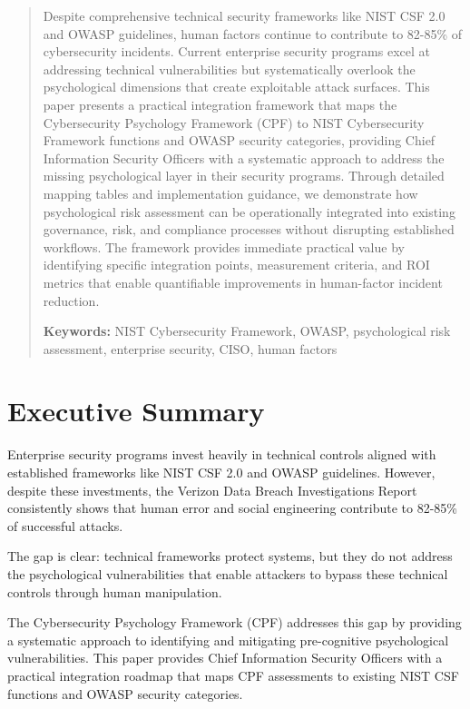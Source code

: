 \documentclass[11pt,a4paper]{article}
\begin{document}
\begin{abstract}
\noindent
Despite comprehensive technical security frameworks like NIST CSF 2.0 and OWASP guidelines, human factors continue to contribute to 82-85\% of cybersecurity incidents. Current enterprise security programs excel at addressing technical vulnerabilities but systematically overlook the psychological dimensions that create exploitable attack surfaces. This paper presents a practical integration framework that maps the Cybersecurity Psychology Framework (CPF)\cite{canale2025} to NIST Cybersecurity Framework functions and OWASP security categories, providing Chief Information Security Officers with a systematic approach to address the missing psychological layer in their security programs. Through detailed mapping tables and implementation guidance, we demonstrate how psychological risk assessment can be operationally integrated into existing governance, risk, and compliance processes without disrupting established workflows. The framework provides immediate practical value by identifying specific integration points, measurement criteria, and ROI metrics that enable quantifiable improvements in human-factor incident reduction.

\vspace{0.5em}
\noindent\textbf{Keywords:} NIST Cybersecurity Framework, OWASP, psychological risk assessment, enterprise security, CISO, human factors
\end{abstract}

\vspace{1cm}

\section{Executive Summary}

Enterprise security programs invest heavily in technical controls aligned with established frameworks like NIST CSF 2.0 and OWASP guidelines. However, despite these investments, the Verizon Data Breach Investigations Report consistently shows that human error and social engineering contribute to 82-85\% of successful attacks\cite{verizon2024}.

The gap is clear: technical frameworks protect systems, but they do not address the psychological vulnerabilities that enable attackers to bypass these technical controls through human manipulation.

The Cybersecurity Psychology Framework (CPF)\cite{canale2025} addresses this gap by providing a systematic approach to identifying and mitigating pre-cognitive psychological vulnerabilities. This paper provides Chief Information Security Officers with a practical integration roadmap that maps CPF assessments to existing NIST CSF functions and OWASP security categories.
\end{document}

